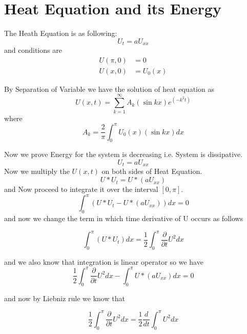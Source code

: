 
\section{Heat Equation and its Energy}
 The Heath Equation is as following:
 \begin{equation}
     U_t = a{U}_{xx}
 \end{equation}
 and conditions are 
 \begin{align*}
     U(\pi,0) &= 0\\
     U(x,0) &= {U}_{0}(x)
 \end{align*}
     
 By Separation of Variable we have the solution of heat equation as
 \begin{equation}
     U(x,t) = \sum_{k=1}^{\infty} A_{k}(\sin{kx})e^{(-k^2t)}
 \end{equation}
 where
 \begin{equation}
     A_k = \frac{2}{\pi} \int_{0}^{\pi} U_{0}(x)(\sin{kx})dx
 \end{equation}
  
  Now we prove Energy for the system is decreasing i.e. System is dissipative.
 \begin{equation}
     U_t = a{U}_{xx}
 \end{equation}
Now we multiply the  $U(x,t)$ on both sides of Heat Equation.
\begin{equation}
     U*U_t = U*(a{U}_{xx})
\end{equation}
and Now proceed to integrate it over the interval $[0,\pi]$.
\begin{equation}
     \int_{0}^{\pi}(U*U_t - U*(a{U}_{xx}))dx = 0
\end{equation}
and now we change the term in which time derivative of U occurs as follows

\begin{equation}
     \int_{0}^{\pi}(U*U_t)dx = \frac{1}{2} \int_{0}^{\pi}\frac{\partial}{\partial{t}}U^{2}dx
\end{equation}

and we also know that integration is linear operator so we have
\begin{equation}
     \frac{1}{2} \int_{0}^{\pi}\frac{\partial}{\partial{t}}U^{2}dx - \int_{0}^{\pi}U*(a{U}_{xx})dx = 0
\end{equation}

and now by Liebniz rule we know that 

\begin{equation}
     \frac{1}{2} \int_{0}^{\pi}\frac{\partial}{\partial{t}}U^{2}dx = \frac{1}{2}\frac{d}{dt} \int_{0}^{\pi}U^{2}dx 
\end{equation}


